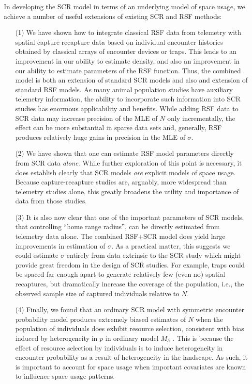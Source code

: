 \documentclass[12pt]{article}
\begin{document}
In developing the SCR model in terms of an underlying model of space
usage, we achieve a number of useful extensions of existing
SCR and RSF methods:
\begin{itemize}
\item[(1)] We have shown how to integrate classical RSF data from
telemetry with spatial capture-recapture data based on individual
encounter histories obtained by classical arrays of encounter devices
or traps. This leads to an improvement in our ability to estimate
density, and also an improvement in our ability to estimate parameters
of the RSF function.  Thus, the combined model is both an extension of
standard SCR models and also and extension of standard RSF models. As
many animal population studies have auxiliary telemetry information,
the ability to incorporate such information into SCR studies has
enormous applicability and 
benefits. 
While adding RSF data to SCR data may increase precision of the MLE of $N$
only incrementally, the effect can be more substantial in sparse data sets
and, generally, RSF produces
relatively huge gains in precision in the MLE of $\sigma$.
\item[(2)] We have shown that one can estimate RSF model parameters
directly from SCR data {\it alone}.
While further exploration of this point
is necessary,
it does establish clearly that SCR
models {\it are} explicit models of space usage. Because
capture-recapture studies are, arguably, more widespread than
telemetry studies alone, this greatly broadens the utility and
importance of data from those studies.
\item[(3)] It is also now clear
that one of the important parameters of SCR models, that controlling
``home range radius'', can be directly estimated from telemetry data
alone.
The combined RSF+SCR model does yield large improvements in estimation
of $\sigma$. As a practical matter, this suggests we could estimate
$\sigma$ entirely from data extrinsic to the SCR study which might
provide great freedom in the design of SCR studies. For example, traps
could be spaced far enough apart to generate relatively few (even no) spatial recaptures,
but dramatically increase the coverage of the population, i.e., the
observed sample size of captured individuals relative to $N$.
\item[(4)] Finally, we found that an
ordinary SCR model with symmetric encounter probability model produces
extremely biased estimates of $N$ when the population of individuals
does exhibit resource selection, consistent with bias induced by
heterogeneity in $p$ in ordinary model $M_{h}$
\citep{dorazio_royle:2003}. This is because the effect of resource
selection by individuals is to induce heterogeneity in encounter
probability as a result of heterogeneity in the landscape.
  As such, it is important to account
for space usage when important covariates are known to influence
space usage patterns.
\end{itemize}
\end{document}
